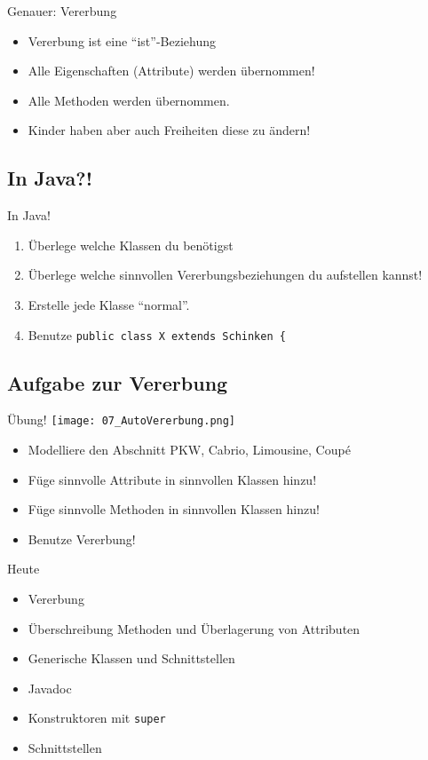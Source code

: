 \documentclass[18pt]{beamer}
\begin{document}
\begin{frame}{Genauer: Vererbung}
 \begin{itemize}
  \item Vererbung ist eine ``ist''-Beziehung
  \item Alle Eigenschaften (Attribute) werden übernommen!
  \item Alle Methoden werden übernommen.
  \item Kinder haben aber auch Freiheiten diese zu ändern!
 \end{itemize}
\end{frame}


\subsection{In Java?!}
\begin{frame}[fragile]{In Java!}
 \begin{enumerate}
  \item Überlege welche Klassen du benötigst
  \item Überlege welche sinnvollen Vererbungsbeziehungen du aufstellen kannst!
  \item Erstelle jede Klasse ``normal''.
  \item Benutze \verb|public class X extends Schinken {|
 \end{enumerate}
\end{frame}

\subsection{Aufgabe zur Vererbung}
\begin{frame}{Übung!}
 \texttt{[image: 07\_AutoVererbung.png]}
 \begin{itemize}
  \item Modelliere den Abschnitt PKW, Cabrio, Limousine, Coupé
  \item Füge sinnvolle Attribute in sinnvollen Klassen hinzu!
  \item Füge sinnvolle Methoden in sinnvollen Klassen hinzu!
  \item Benutze Vererbung!
 \end{itemize}

\end{frame}

\begin{frame}[fragile]{Heute}
\begin{itemize}
 \item Vererbung \checkmark
 \item Überschreibung Methoden und Überlagerung von Attributen
 \item Generische Klassen und Schnittstellen
 \item Javadoc
 \item Konstruktoren mit \verb|super|
 \item Schnittstellen 
\end{itemize}
\end{frame}
\end{document}
